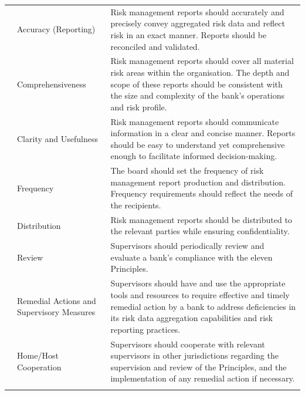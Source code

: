 \documentclass[11pt]{article}
\begin{document}
\begin{longtable}{cp{3cm}p{10.5cm}}
    \addlinespace
    7 & Accuracy (Reporting) & Risk management reports should accurately and precisely convey aggregated risk data and reflect risk in an exact manner. Reports should be reconciled and validated. \\
    \addlinespace
    8 & Comprehensiveness & Risk management reports should cover all material risk areas within the organisation. The depth and scope of these reports should be consistent with the size and complexity of the bank's operations and risk profile. \\
    \addlinespace
    9 & Clarity and Usefulness & Risk management reports should communicate information in a clear and concise manner. Reports should be easy to understand yet comprehensive enough to facilitate informed decision-making. \\
    \addlinespace
    10 & Frequency & The board should set the frequency of risk management report production and distribution. Frequency requirements should reflect the needs of the recipients. \\
    \addlinespace
    11 & Distribution & Risk management reports should be distributed to the relevant parties while ensuring confidentiality. \\
    \addlinespace
    12 & Review & Supervisors should periodically review and evaluate a bank's compliance with the eleven Principles. \\
    \addlinespace
    13 & Remedial Actions and Supervisory Measures & Supervisors should have and use the appropriate tools and resources to require effective and timely remedial action by a bank to address deficiencies in its risk data aggregation capabilities and risk reporting practices. \\
    \addlinespace
    14 & Home/Host Cooperation & Supervisors should cooperate with relevant supervisors in other jurisdictions regarding the supervision and review of the Principles, and the implementation of any remedial action if necessary. \\
    \addlinespace
    \bottomrule
\end{longtable}

\end{document}

